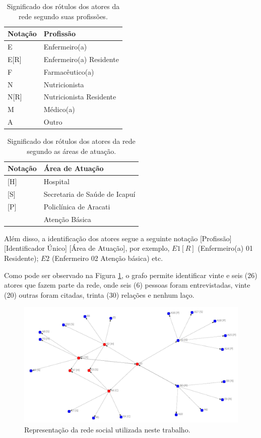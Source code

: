 \begin{table}[htbp]
\centering
\caption{Significado dos rótulos dos atores da rede segundo suas profissões.}
\label{graph-job}
\begin{tabular}{|l|l|}
\hline
Notação  & Profissão               \\ \hline
E        & Enfermeiro(a)           \\ \hline
E{[}R{]} & Enfermeiro(a) Residente \\ \hline
F        & Farmacêutico(a)         \\ \hline
N        & Nutricionista           \\ \hline
N{[}R{]} & Nutricionista Residente \\ \hline
M        & Médico(a)               \\ \hline
A        & Outro                   \\ \hline
\end{tabular}
\end{table}

\begin{table}[htbp]
\centering
\caption{Significado dos rótulos dos atores da rede segundo as áreas de atuação.}
\label{graph-place}
\begin{tabular}{|l|l|}
\hline
Notação & Área de Atuação                       \\ \hline
{[}H{]} & Hospital                      \\ \hline
{[}S{]} & Secretaria de Saúde de Icapuí \\ \hline
{[}P{]} & Policlínica de Aracati        \\ \hline
        & Atenção Básica                \\ \hline
\end{tabular}
\end{table}

Além disso, a identificação dos atores segue a seguinte notação [Profissão][Identificador Único] [Área de Atuação], por exemplo, $E1 [R]$ (Enfermeiro(a) 01 Residente); $E2$ (Enfermeiro 02 Atenção básica) etc.

Como pode ser observado na Figura \ref{fig:grafos}, o grafo permite identificar vinte e seis (26) atores que fazem parte da rede, onde seis (6) pessoas foram entrevistadas, vinte (20) outras foram citadas, trinta (30) relações e nenhum laço.

\begin{figure}[htbp]
\centering
 \includegraphics[width=.85\textwidth]{figuras/grafo-grupos.pdf}
 \caption{Representação da rede social utilizada neste trabalho.}
\label{fig:grafos}
\end{figure}

